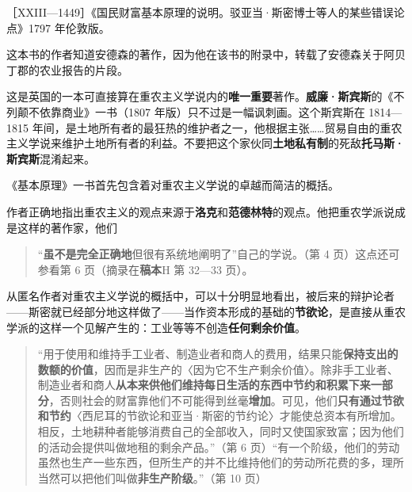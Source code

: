 
［XXIII—1449］《国民财富基本原理的说明。驳亚当·斯密博士等人的某些错误论点》1797 年伦敦版。

这本书的作者知道安德森的著作，因为他在该书的附录中，转载了安德森关于阿贝丁郡的农业报告的片段。

这是英国的一本可直接算在重农主义学说内的\textbf{唯一重要}著作。\textbf{威廉·斯宾斯}的《不列颠不依靠商业》一书（1807 年版）只不过是一幅讽刺画。这个斯宾斯在 1814—1815 年间，是土地所有者的最狂热的维护者之一，他根据主张……贸易自由的重农主义学说来维护土地所有者的利益。不要把这个家伙同\textbf{土地私有制}的死敌\textbf{托马斯·斯宾斯}混淆起来。

《基本原理》一书首先包含着对重农主义学说的卓越而简洁的概括。

作者正确地指出重农主义的观点来源于\textbf{洛克}和\textbf{范德林特}的观点。他把重农学派说成是这样的著作家，他们

\begin{quote}“\textbf{虽不是完全正确地}但很有系统地阐明了”自己的学说。（第 4 页）这点还可参看第 6 页（摘录在\textbf{稿本}H 第 32—33 页）。\end{quote}

从匿名作者对重农主义学说的概括中，可以十分明显地看出，被后来的辩护论者——斯密就已经部分地这样做了——当作资本形成的基础的\textbf{节欲论}，是直接从重农学派的这样一个见解产生的：工业等等不创造\textbf{任何剩余价值}。

\begin{quote}“用于使用和维持手工业者、制造业者和商人的费用，结果只能\textbf{保持支出的数额的价值}，因而是非生产的〈因为它不生产剩余价值〉。除非手工业者、制造业者和商人\textbf{从本来供他们维持每日生活的东西中节约和积累下来一部分}，否则社会的财富靠他们不可能得到丝毫\textbf{增加}。可见，他们\textbf{只有通过节欲和节约}〈西尼耳的节欲论和亚当·斯密的节约论〉才能使总资本有所增加。相反，土地耕种者能够消费自己的全部收入，同时又使国家致富；因为他们的活动会提供叫做地租的剩余产品。”（第 6 页）“有一个阶级，他们的劳动虽然也生产一些东西，但所生产的并不比维持他们的劳动所花费的多，理所当然可以把他们叫做\textbf{非生产阶级}。”（第 10 页）\end{quote}

